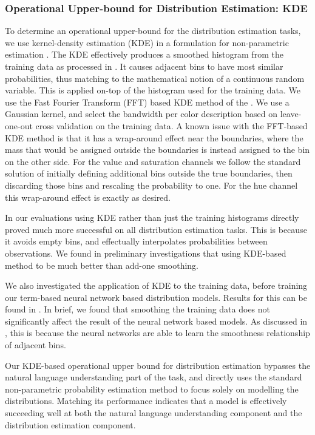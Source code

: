 \documentclass[]{book}
\newcommand{\parencite}{\citep}
\newcommand{\textcite}{\citet}
\begin{document}
\subsubsection{Operational Upper-bound for Distribution Estimation: KDE}\label{sec:direct-histogram} \label{sec:kernel-density-based-smoothing}
To determine an operational upper-bound for the distribution estimation tasks,
we use kernel-density estimation (KDE) in a formulation for non-parametric estimation \parencite{silverman1986density} .
The KDE effectively produces a smoothed histogram from the training data as processed in .
It causes adjacent bins to have most similar probabilities, thus matching to the mathematical notion of a continuous random variable.
This is applied on-top of the histogram used for the training data.
We use the Fast Fourier Transform (FFT) based KDE method of the \textcite{silverman1982algorithm}.
We use a Gaussian kernel, and select the bandwidth per color description based on leave-one-out cross validation on the training data.
A known issue with the FFT-based KDE method is that it has a wrap-around effect near the boundaries, where the mass that would be assigned outside the boundaries is instead assigned to the bin on the other side.
For the value and saturation channels we follow the standard solution of initially defining additional bins outside the true boundaries, then discarding those bins and rescaling the probability to one.
For the hue channel this wrap-around effect is exactly as desired.

In our evaluations using KDE rather than just the training histograms directly proved much more successful on all distribution estimation tasks.
This is because it avoids empty bins, and effectually interpolates probabilities between observations.
We found in preliminary investigations that using KDE-based method to be much better than add-one smoothing.

We also investigated the application of KDE to the training data,  before training our term-based neural network based distribution models.
Results for this can be found in .
In brief, we found that smoothing the training data does not significantly affect the result of the neural network based models.
As discussed in , this is because the neural networks are able to learn the smoothness relationship of adjacent bins.


Our KDE-based operational upper bound for distribution estimation bypasses the natural language understanding part of the task,
and directly uses the standard non-parametric probability estimation method to focus solely on modelling the distributions.
Matching its performance indicates that a model is effectively succeeding well at both the natural language understanding component and the distribution estimation component.
\end{document}
